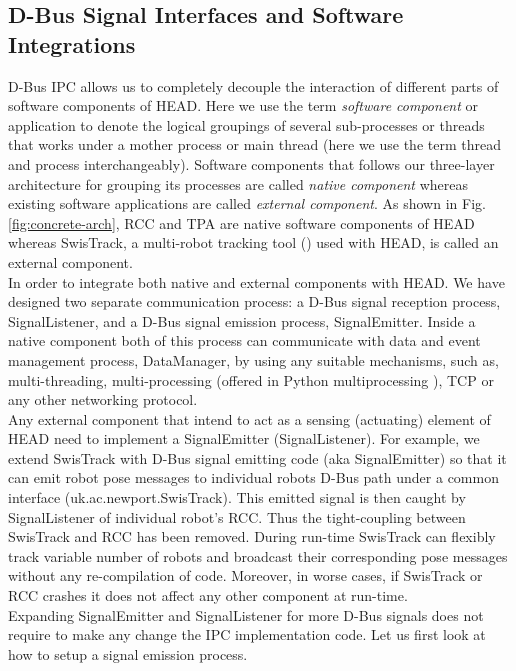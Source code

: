 \documentclass{ifacconf}
\begin{document}
\subsection{D-Bus Signal Interfaces and Software Integrations}
D-Bus IPC allows us to completely decouple the interaction of different parts of software components of HEAD. Here we use the term {\em software component} or application to denote the logical groupings of several sub-processes or threads that works under a mother process or main thread (here we use the term thread and process interchangeably). Software components that follows our three-layer architecture for grouping its processes are called {\em native component} whereas existing software applications are called {\em external component}. As shown in Fig. \ref{fig:concrete-arch}, RCC and TPA are native software components of HEAD whereas SwisTrack, a multi-robot tracking tool (\cite{Lochmatter+2008}) used with HEAD, is called an external component.\\
In order to integrate both native and external components with HEAD. We have designed two separate communication process: a D-Bus signal reception process, SignalListener, and a D-Bus signal emission process, SignalEmitter. Inside a native component both of this process can communicate with data and event management process, DataManager, by using any suitable mechanisms, such as, multi-threading, multi-processing (offered in Python multiprocessing ), TCP or any other networking protocol.\\
Any external component that intend to act as a sensing (actuating) element of HEAD need to implement a SignalEmitter (SignalListener). For example, we extend SwisTrack with D-Bus signal emitting code (aka SignalEmitter) so that it can emit robot pose messages to individual robots D-Bus path under a common interface (uk.ac.newport.SwisTrack). This emitted signal is then caught by SignalListener of individual robot's RCC. Thus the tight-coupling between SwisTrack and RCC has been removed. During run-time SwisTrack can flexibly track variable number of robots and broadcast their corresponding pose messages without any re-compilation of code. Moreover, in worse cases, if SwisTrack or RCC crashes it does not affect any other component at run-time.\\
Expanding SignalEmitter and SignalListener for more D-Bus signals does not require to make any change the IPC implementation code. Let us first look at how to setup a signal emission process.
\end{document}
